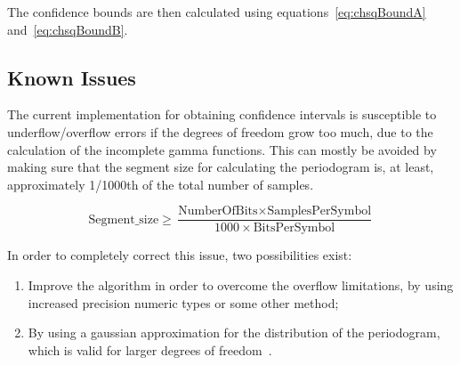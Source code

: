 \begin{refsection}
	The confidence bounds are then calculated using
	equations~\ref{eq:chsqBoundA} and~\ref{eq:chsqBoundB}.







\subsection*{Known Issues}\label{psdestissues}
The current implementation for obtaining confidence intervals is susceptible to
underflow/overflow errors if the degrees of freedom grow too much, due to the calculation of the
incomplete gamma functions. This can mostly be avoided by making sure that
the segment size for calculating the periodogram is, at least, approximately
1/1000th of the total number of samples. 

\begin{equation*}
	\text{Segment\_size} \ge \frac{\text{NumberOfBits} \times
	\text{SamplesPerSymbol}}{1000 \times \text{BitsPerSymbol}}
\end{equation*}

In order to completely correct this
issue, two possibilities exist:
\begin{enumerate}
	\item Improve the algorithm in order to overcome
the overflow limitations, by using increased precision numeric types or some
other method;
\item By using a gaussian approximation for the distribution of the
periodogram, which is valid for larger degrees of freedom~\cite{jeruchim06}.
\end{enumerate}



\clearpage
\printbibliography[heading=subbibliography]
\end{refsection}
\cleardoublepage
